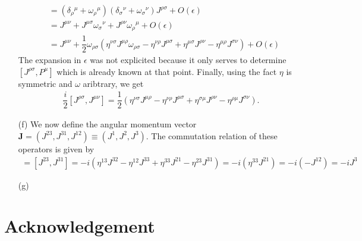 \documentclass[10pt, a4paper]{article}
\begin{document}
\begin{enumerate}
\begin{align*}
      &= (\delta_\rho{ }^\mu + \omega_\rho{ }^\mu)(\delta_\sigma{ }^\nu+\omega_\sigma{ }^\nu) J^{\rho \sigma} + O(\epsilon)\\
      &= J^{\mu \nu} + J^{\mu \sigma} \omega_\sigma{ }^\nu + J^{\rho \nu}\omega_\rho{ }^\mu + O(\epsilon)\\
      &= J^{\mu \nu} + \dfrac{1}{2} \omega_{\rho\sigma} \left(\eta^{\nu \sigma}J^{\mu \rho} \omega_{\rho\sigma} -\eta^{\nu \rho}J^{\mu \sigma} + \eta^{\mu \sigma} J^{\rho \nu} - \eta^{\mu \rho} J^{\sigma \nu}\right) + O(\epsilon)
    \end{align*}
    The expansion in $\epsilon$ was not explicited because it only serves to determine $[J^{\rho \sigma}, P^{\mu}]$ which is already known at that point. Finally, using the fact $\eta$ is symmetric and $\omega$ aribtrary, we get 
    \begin{align*}
      \dfrac{i}{2} [J^{\rho \sigma}, J^{\mu \nu}] = \dfrac{1}{2} \left(\eta^{\nu \sigma} J^{\mu \rho} -\eta^{\nu \rho} J^{\mu \sigma} + \eta^{\sigma\mu} J^{\rho \nu} - \eta^{\rho\mu} J^{\sigma \nu}\right).
    \end{align*}
  \item[(f)] We now define the angular momentum vector $\mathbf{J} = (J^{23}, J^{31}, J^{12}) \equiv (J^1, J^2, J^3)$.  The commutation relation of these operators is given by
  \begin{align*}
    [J^1, J^2] = [J^{23}, J^{31}] = -i \left(\eta^{1 3} J^{3 2} -\eta^{1 2} J^{3 3} + \eta^{33} J^{2 1} - \eta^{23} J^{3 1}\right) = -i \left( \eta^{33} J^{2 1}\right) = -i (-J^{12}) = -i J^3
  \end{align*}  
  \item[(g)]

\end{enumerate}




\section{Acknowledgement}


\makereferences


\end{document}
